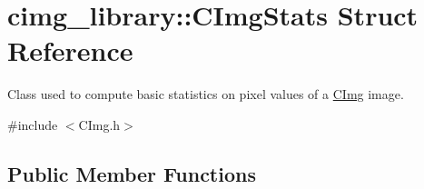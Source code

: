 \hypertarget{structcimg__library_1_1_c_img_stats}{
\section{cimg\_\-library::CImgStats Struct Reference}
\label{structcimg__library_1_1_c_img_stats}
}


Class used to compute basic statistics on pixel values of a \hyperlink{structcimg__library_1_1_c_img}{CImg} image.  




{\ttfamily \#include $<$CImg.h$>$}

\subsection*{Public Member Functions}
